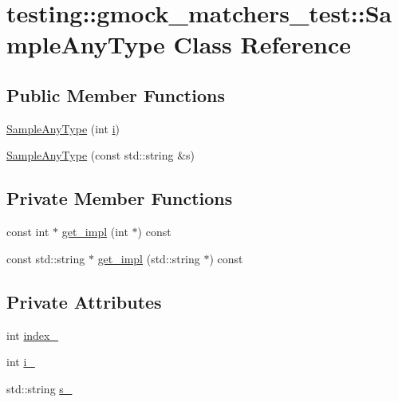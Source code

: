 \hypertarget{classtesting_1_1gmock__matchers__test_1_1_sample_any_type}{}\section{testing\+::gmock\+\_\+matchers\+\_\+test\+::Sample\+Any\+Type Class Reference}
\label{classtesting_1_1gmock__matchers__test_1_1_sample_any_type}
\subsection*{Public Member Functions}
\begin{DoxyCompactItemize}
\item 
\mbox{\hyperlink{classtesting_1_1gmock__matchers__test_1_1_sample_any_type_a8f77e083452210341cb9552fccb4aeab}{Sample\+Any\+Type}} (int \mbox{\hyperlink{_obj__test_2lib_2googletest-master_2googlemock_2test_2gmock-matchers__test_8cc_acb559820d9ca11295b4500f179ef6392}{i}})
\item 
\mbox{\hyperlink{classtesting_1_1gmock__matchers__test_1_1_sample_any_type_a1a9abd19e3f7ca8bc78c05fc5ee2299e}{Sample\+Any\+Type}} (const std\+::string \&s)
\end{DoxyCompactItemize}
\subsection*{Private Member Functions}
\begin{DoxyCompactItemize}
\item 
const int $\ast$ \mbox{\hyperlink{classtesting_1_1gmock__matchers__test_1_1_sample_any_type_a7109ac615de824886820534d012845b5}{get\+\_\+impl}} (int $\ast$) const
\item 
const std\+::string $\ast$ \mbox{\hyperlink{classtesting_1_1gmock__matchers__test_1_1_sample_any_type_ac57574f8f6c7b4aab847f9aaffcb5807}{get\+\_\+impl}} (std\+::string $\ast$) const
\end{DoxyCompactItemize}
\subsection*{Private Attributes}
\begin{DoxyCompactItemize}
\item 
int \mbox{\hyperlink{classtesting_1_1gmock__matchers__test_1_1_sample_any_type_aedfd0aa5bb54c3c2ed3d7125aee82765}{index\+\_\+}}
\item 
int \mbox{\hyperlink{classtesting_1_1gmock__matchers__test_1_1_sample_any_type_aa97090f85e9c9ea9a7093c33d8bfe48b}{i\+\_\+}}
\item 
std\+::string \mbox{\hyperlink{classtesting_1_1gmock__matchers__test_1_1_sample_any_type_a9efe8f287d4690eb126f1d8f399d227b}{s\+\_\+}}
\end{DoxyCompactItemize}

